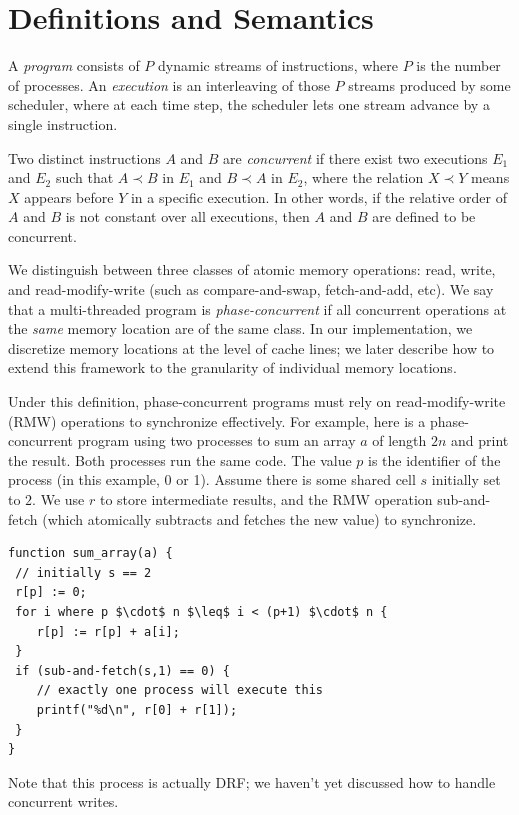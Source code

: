 \documentclass{article}
\begin{document}
\section{Definitions and Semantics}

A \textit{program} consists of $P$ dynamic streams of instructions, where $P$ is the number of processes. An \textit{execution} is an interleaving of those $P$ streams produced by some scheduler, where at each time step, the scheduler lets one stream advance by a single instruction.

Two distinct instructions $A$ and $B$ are \textit{concurrent} if there exist two executions $E_1$ and $E_2$ such that $A \prec B$ in $E_1$ and $B \prec A$ in $E_2$, where the relation $X \prec Y$ means $X$ appears before $Y$ in a specific execution. In other words, if the relative order of $A$ and $B$ is not constant over all executions, then $A$ and $B$ are defined to be concurrent.

We distinguish between three classes of atomic memory operations: read, write, and read-modify-write (such as compare-and-swap, fetch-and-add, etc). We say that a multi-threaded program is \textit{phase-concurrent} if all concurrent operations at the \textit{same} memory location are of the same class. In our implementation, we discretize memory locations at the level of cache lines; we later describe how to extend this framework to the granularity of individual memory locations.

Under this definition, phase-concurrent programs must rely on read-modify-write (RMW) operations to synchronize effectively. For example, here is a phase-concurrent program using two processes to sum an array $a$ of length $2n$ and print the result. Both processes run the same code. The value $p$ is the identifier of the process (in this example, 0 or 1). Assume there is some shared cell $s$ initially set to $2$. We use $r$ to store intermediate results, and the RMW operation sub-and-fetch (which atomically subtracts and fetches the new value) to synchronize.

\begin{lstlisting}
function sum_array(a) {
 // initially s == 2
 r[p] := 0;
 for i where p $\cdot$ n $\leq$ i < (p+1) $\cdot$ n {
 	r[p] := r[p] + a[i];
 }
 if (sub-and-fetch(s,1) == 0) {
 	// exactly one process will execute this
 	printf("%d\n", r[0] + r[1]);
 }
}
\end{lstlisting}

Note that this process is actually DRF; we haven't yet discussed how to handle concurrent writes.
\end{document}

